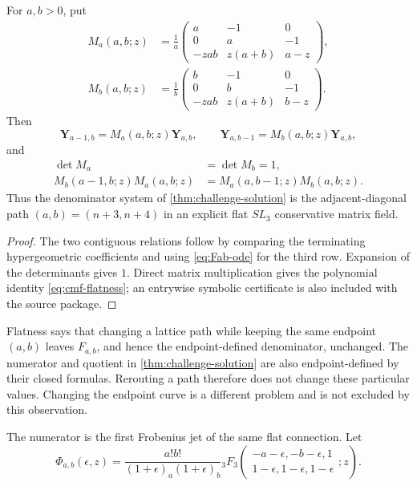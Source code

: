 \begin{theorem}
\label{thm:flat-cmf}
For \(a,b>0\), put
\begin{align}
 M_a(a,b;z)&=\frac1a
 \begin{pmatrix}
 a&-1&0\\
 0&a&-1\\
 -zab&z(a+b)&a-z
 \end{pmatrix},\label{eq:Ma}\\
 M_b(a,b;z)&=\frac1b
 \begin{pmatrix}
 b&-1&0\\
 0&b&-1\\
 -zab&z(a+b)&b-z
 \end{pmatrix}.\label{eq:Mb}
\end{align}
Then
\[
 \mathbf Y_{a-1,b}=M_a(a,b;z)\mathbf Y_{a,b},
 \qquad
 \mathbf Y_{a,b-1}=M_b(a,b;z)\mathbf Y_{a,b},
\]
and
\begin{align}
 \det M_a&=\det M_b=1,\label{eq:cmf-det}\\
 M_b(a-1,b;z)M_a(a,b;z)
 &=M_a(a,b-1;z)M_b(a,b;z).
 \label{eq:cmf-flatness}
\end{align}
Thus the denominator system of \cref{thm:challenge-solution} is the
adjacent-diagonal path \((a,b)=(n+3,n+4)\) in an explicit flat \(SL_3\)
conservative matrix field.
\end{theorem}

\begin{proof}
The two contiguous relations follow by comparing the terminating
hypergeometric coefficients and using \eqref{eq:Fab-ode} for the third row.
Expansion of the determinants gives \(1\).  Direct matrix multiplication
gives the polynomial identity \eqref{eq:cmf-flatness}; an entrywise symbolic
certificate is also included with the source package.
\end{proof}

\begin{remark}
Flatness says that changing a lattice path while keeping the same endpoint
\((a,b)\) leaves \(F_{a,b}\), and hence the endpoint-defined denominator,
unchanged.  The numerator and quotient in \cref{thm:challenge-solution} are
also endpoint-defined by their closed formulas.  Rerouting a path therefore
does not change these particular values.  Changing the endpoint curve is a
different problem and is not excluded by this observation.
\end{remark}

The numerator is the first Frobenius jet of the same flat connection.  Let
\begin{equation}\label{eq:Phi-epsilon}
 \Phi_{a,b}(\epsilon,z)=
 \frac{a!b!}{(1+\epsilon)_a(1+\epsilon)_b}
 {}_3F_3\!\left(
 \begin{matrix}-a-\epsilon,-b-\epsilon,1\\
 1-\epsilon,1-\epsilon,1-\epsilon
 \end{matrix};z\right).
\end{equation}

